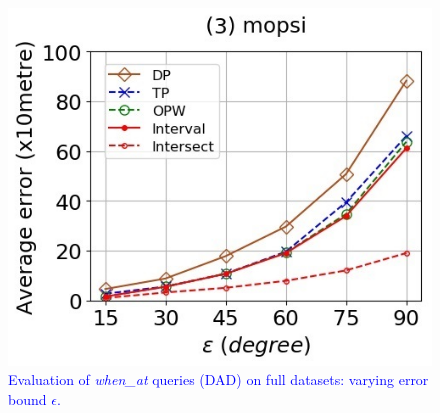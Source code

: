 \begin{figure}[tb!]
	\includegraphics[scale = 0.400]{Figures/Exp-when-DAD-error-epsilon-mopsi.jpg}
	\vspace{-1ex}
	\caption{\small \textcolor{blue}{Evaluation of \emph{when\_at} queries (DAD) on full datasets: varying error bound $\epsilon$.}}
	\label{fig:query-when-dad-epsilon}
	\vspace{-1.0ex}
\end{figure}



